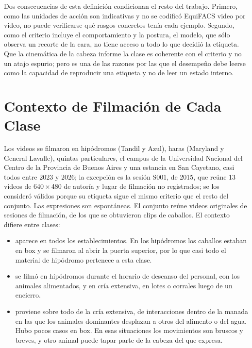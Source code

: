 Dos consecuencias de esta definición condicionan el resto del trabajo. Primero, como las unidades de acción son indicativas y no se codificó EquiFACS video por video, no puede verificarse qué rasgos concretos tenía cada ejemplo. Segundo, como el criterio incluye el comportamiento y la postura, el modelo, que sólo observa un recorte de la cara, no tiene acceso a todo lo que decidió la etiqueta. Que la cinemática de la cabeza informe la clase es coherente con el criterio y no un atajo espurio; pero es una de las razones por las que el desempeño debe leerse como la capacidad de reproducir una etiqueta y no de leer un estado interno.

\section{Contexto de Filmación de Cada Clase}
Los videos se filmaron en hipódromos (Tandil y Azul), haras (Maryland y General Lavalle), quintas particulares, el campus de la Universidad Nacional del Centro de la Provincia de Buenos Aires y una estancia en San Cayetano, casi todos entre 2023 y 2026; la excepción es la sesión S001, de 2015, que reúne 13 videos de 640\,$\times$\,480 de autoría y lugar de filmación no registrados; se los consideró válidos porque su etiqueta sigue el mismo criterio que el resto del conjunto. Las expresiones son espontáneas. El conjunto reúne \VideosTotal{} videos originales de \SesionesTotal{} sesiones de filmación, de los que se obtuvieron \ClipsTotal{} clips de \CaballosTotal{} caballos. El contexto difiere entre clases:

\begin{itemize}
  \item {} aparece en todos los establecimientos. En los hipódromos los caballos estaban en box y se filmaron al abrir la puerta superior, por lo que casi todo el material de hipódromo pertenece a esta clase.
  \item {} se filmó en hipódromos durante el horario de descanso del personal, con los animales alimentados, y en cría extensiva, en lotes o corrales luego de un encierro.
  \item {} proviene sobre todo de la cría extensiva, de interacciones dentro de la manada en las que los animales dominantes desplazan a otros del alimento o del agua. Hubo pocos casos en box. En esas situaciones los movimientos son bruscos y breves, y otro animal puede tapar parte de la cabeza del que expresa.
\end{itemize}

